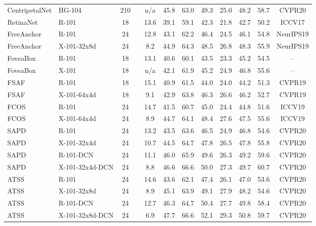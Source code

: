 \documentclass{article}
\begin{document}
\begin{table*}[t]
\begin{threeparttable}
{\begin{tabular}{l|l|c|c|c|ccc|ccc|c}
				CentripetalNet \cite{dong2020centripetalnet} & HG-104 & 210 &  & n/a  & 45.8 & 63.0 & 49.3 & 25.0 & 48.2 & 58.7 & CVPR20\\
RetinaNet \cite{lin2017focal} &R-101 &  18 &  & 13.6 &39.1 &59.1 &42.3 &21.8 &42.7 &50.2 & ICCV17 \\
				FreeAnchor \cite{zhang2019freeanchor} & R-101 & 24 &  & 12.8 & 43.1 & 62.2 & 46.4 & 24.5 & 46.1 & 54.8 & NeurIPS19 \\
				FreeAnchor \cite{zhang2019freeanchor} & X-101-32x8d & 24 &  & 8.2 & 44.9 & 64.3 & 48.5 & 26.8 & 48.3 & 55.9 & NeurIPS19 \\
				FoveaBox \cite{kong2019foveabox}& R-101 & 18 &  & 13.1 & 40.6 & 60.1 & 43.5 & 23.3 & 45.2 & 54.5 & -- \\
				FoveaBox \cite{kong2019foveabox}& X-101 & 18 &  & n/a  & 42.1 & 61.9 & 45.2 & 24.9 & 46.8 & 55.6 & -- \\
				FSAF \cite{zhu2019feature} & R-101 & 18 &  & 15.1 & 40.9 & 61.5 & 44.0 & 24.0 & 44.2 & 51.3 & CVPR19\\
				FSAF \cite{zhu2019feature}& X-101-64x4d & 18 &  & 9.1 & 42.9 & 63.8 & 46.3 & 26.6 & 46.2 & 52.7 & CVPR19 \\
				FCOS \cite{tian2019fcos} & R-101 & 24 &  & 14.7 &41.5 & 60.7 & 45.0 & 24.4 & 44.8 & 51.6 & ICCV19\\
				FCOS \cite{tian2019fcos} & X-101-64x4d & 24 &  & 8.9 & 44.7 & 64.1 & 48.4 & 27.6 & 47.5 & 55.6 & ICCV19\\
				SAPD \cite{zhu2019soft}& R-101 & 24 &  & 13.2 & 43.5 & 63.6 & 46.5 & 24.9 & 46.8 & 54.6 & CVPR20 \\
				SAPD \cite{zhu2019soft}& X-101-32x4d & 24 &  & 10.7 & 44.5 & 64.7 & 47.8 & 26.5 & 47.8 & 55.8 & CVPR20 \\
				SAPD \cite{zhu2019soft}&  R-101-DCN & 24 &  & 11.1 & 46.0 & 65.9 & 49.6 & 26.3 & 49.2 & 59.6 & CVPR20 \\
				SAPD \cite{zhu2019soft}& X-101-32x4d-DCN & 24 &  & 8.8 & 46.6 & 66.6 & 50.0 & 27.3 & 49.7 & 60.7 & CVPR20 \\
				ATSS \cite{zhang2019bridging}& R-101 & 24 &  & 14.6 &43.6 &62.1 &47.4 &26.1 &47.0 &53.6 & CVPR20 \\
				ATSS \cite{zhang2019bridging}& X-101-32x8d & 24 &  & 8.9 &45.1 &63.9 &49.1 &27.9 &48.2 &54.6 & CVPR20 \\
				ATSS \cite{zhang2019bridging} &R-101-DCN & 24 &   & 12.7 & 46.3 &64.7 &50.4 &27.7 &49.8 &58.4 & CVPR20\\
				ATSS \cite{zhang2019bridging}& X-101-32x8d-DCN & 24 &  & 6.9 & {47.7} & {66.6} &{52.1} & {29.3} &50.8 & {59.7} & CVPR20 \\

\end{tabular}}
\end{threeparttable}
\end{table*}
\end{document}
